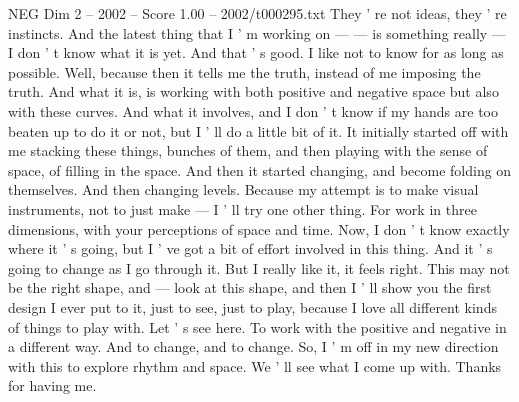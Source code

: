 \begin{textsample}{NEG Dim 2 – 2002 – Score 1.00 – 2002/t000295.txt}
They ' re not ideas, they ' re instincts.
And the latest thing that I ' m working on — — is something really — I don ' t know what it is yet.
And that ' s good.
I like not to know for as long as possible.
Well, because then it tells me the truth, instead of me imposing the truth.
And what it is, is working with both positive and negative space but also with these curves.
And what it involves, and I don ' t know if my hands are too beaten up to do it or not, but I ' ll do a little bit of it.
It initially started off with me stacking these things, bunches of them, and then playing with the sense of space, of filling in the space.
And then it started changing, and become folding on themselves.
And then changing levels.
Because my attempt is to make visual instruments, not to just make — I ' ll try one other thing.
For work in three dimensions, with your perceptions of space and time.
Now, I don ' t know exactly where it ' s going, but I ' ve got a bit of effort involved in this thing.
And it ' s going to change as I go through it.
But I really like it, it feels right.
This may not be the right shape, and — look at this shape, and then I ' ll show you the first design I ever put to it, just to see, just to play, because I love all different kinds of things to play with.
Let ' s see here.
To work with the positive and negative in a different way.
And to change, and to change.
So, I ' m off in my new direction with this to explore rhythm and space.
We ' ll see what I come up with.
Thanks for having me.

\end{textsample}

